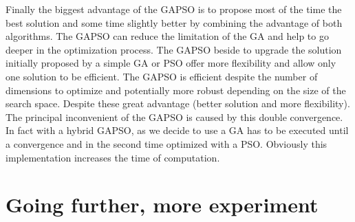 Finally the biggest advantage of the GAPSO is to propose most of the time the best solution and some time slightly better by combining the advantage of both algorithms. 
The GAPSO can reduce the limitation of the GA and help to go deeper in the optimization process. The GAPSO  beside to upgrade the solution initially proposed by a simple GA or PSO offer more flexibility and allow only one solution to be efficient. The GAPSO is efficient despite the number of dimensions to optimize and potentially more robust depending on the size of the search space.
Despite these great advantage (better solution and more flexibility).
The principal inconvenient of the GAPSO is caused by this double convergence. In fact with a hybrid GAPSO, as we decide to use a GA has to be executed until a convergence and in the second time optimized with a PSO. Obviously this implementation increases the time of computation.
 
   
		
\section{Going further, more experiment }

